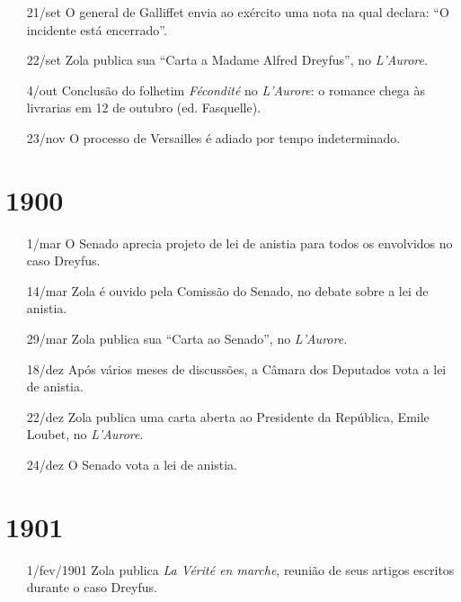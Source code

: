 \begin{itemize}
\item[21/set] O general de Galliffet envia ao exército uma nota na qual
declara: ``O incidente está encerrado''.

\item[22/set] Zola publica sua ``Carta a Madame Alfred Dreyfus'', no
\textit{L'Aurore}.

\item[4/out] Conclusão do folhetim \textit{Fécondité} no \textit{L'Aurore}: o
romance chega às livrarias em 12 de outubro (ed. Fasquelle).

\item[23/nov] O processo de Versailles é adiado por tempo indeterminado.
\end{itemize}


\section{1900}
\begin{itemize}
\setlength\itemsep{-1mm}
\item[1/mar] O Senado aprecia projeto de lei de anistia para todos os
envolvidos no caso Dreyfus.

\item[14/mar] Zola é ouvido pela Comissão do Senado, no debate sobre a lei de
anistia.

\item[29/mar] Zola publica sua ``Carta ao Senado'', no \textit{L'Aurore.}

\item[18/dez] Após vários meses de discussões, a Câmara dos Deputados vota a
lei de anistia.

\item[22/dez] Zola publica uma carta aberta ao Presidente da República, Emile
Loubet, no \textit{L'Aurore}.

\item[24/dez] O Senado vota a lei de anistia.
\end{itemize}

\section{1901}
\begin{itemize}
\setlength\itemsep{-1mm}
\item[1/fev/1901] Zola publica \textit{La Vérité en marche}, reunião de seus
artigos escritos durante o caso Dreyfus.
\end{itemize}

